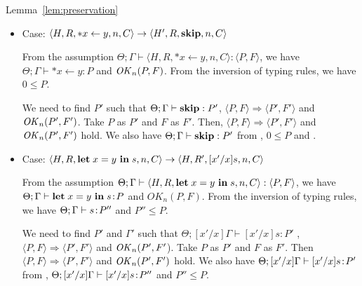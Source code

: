 \begin{pfof}{Lemma~\ref{lem:preservation}}
\begin{itemize}
  From the assumption \( \Theta; \Gamma \vdash \langle H, R, \SKIP;s, n,
  C \rangle : \langle P, F \rangle\), we have \(\Theta;\Gamma
  \vdash \SKIP;s\COL P\) and \(\OK_{n}(P, F)\). From the inversion of
  the typing rules, we get \(\Theta; \Gamma \vdash s\COL P''\) and
  \(0;P'' \le P\). From the definition of subtyping, we have \(
  \langle P, F \rangle \Longrightarrow \langle Q, F \rangle\) and \(P''
  \le Q\) for some \(Q\).

  We need to find \(P'\) and \(F'\) such that \(\Theta; \Gamma \vdash s : P'\)
  and \(\langle P, F \rangle \rightarrow \langle P', F' \rangle\)
  and \(OK_n(P', F')\). Take \(Q\) as \(P'\) and \(F\) as \(F'\). Then
  \(\langle P, F\rangle \Longrightarrow \langle P', F' \rangle\) and
  \(OK_n(P', F')\) hold. We also have \(\Theta;\Gamma \vdash s\COL
  P'\) from , \(\Gamma \vdash s\COL P''\) and \(P'' \le Q\).

\item Case: \( \langle H, R, *x \leftarrow y , n, C\rangle \rightarrow
  \langle H', R, \mathbf{skip}, n, C\rangle \)

  From the assumption \( \Theta; \Gamma \vdash \langle H, R, *x
  \leftarrow y, n, C \rangle : \langle P, F \rangle\), we have
  \(\Theta; \Gamma \vdash *x \leftarrow y : P\) and \(\OK_{n}(P,
  F)\). From the inversion of typing rules, we have \(0 \le P\).

  We need to find \(P'\) such that \(\Theta; \Gamma \vdash \mathbf{skip}:
  P'\), \( \langle P, F \rangle \Longrightarrow \langle P', F'
  \rangle \) and \(\mathit{OK}_n(P', F')\). Take \(P\) as \(P'\) and \(F\) as
  \(F'\). Then, \( \langle P, F\rangle \Longrightarrow \langle P',
  F'\rangle\) and \(\mathit{OK}_n(P', F')\) hold. We also have \(\Theta;
  \Gamma \vdash \mathbf{skip}: P'\) from , \(0 \le P\) and
  .

\item Case: \( \langle H, R, \mathbf{let}\; x = y\ \mathbf{in}\; s , n, C \rangle
  \rightarrow \langle H, R', [x'/x]s, n, C \rangle \)

  From the assumption \( \Theta; \Gamma \vdash \langle H, R, \mathbf{let}\; x =
  y\ \mathbf{in}\; s, n, C \rangle : \langle P, F \rangle\), we have \(\Theta;
  \Gamma \vdash \mathbf{let}\; x = y \ \mathbf{in}\; s \!:\! P\) and \(OK_{n}(P, F)\). From
  the inversion of typing rules, we have \(\Theta; \Gamma \vdash s\COL
  P''\) and \(P'' \le P\).

  We need to find \(P'\) and \(\Gamma'\) such that \(\Theta;
  [x'/x]\Gamma \vdash [x'/x]s : P'\) , \( \langle P, F \rangle
  \Longrightarrow \langle P', F' \rangle\) and \(\mathit{OK}_n(P', F'\)). Take
  \(P\) as \(P'\) and \(F\) as \(F'\). Then \( \langle P,F \rangle
  \Longrightarrow \langle P', F' \rangle\) and \(\mathit{OK}_n(P', F')\) hold.  We
  also have \(\Theta; [x'/x]\Gamma \vdash [x'/x]s\!:\! P'\) from
  , \(\Theta; [x'/x]\Gamma \vdash [x'/x]s\!:\! P''\) and \(
  P'' \le P\).


\end{itemize}
\end{pfof}
